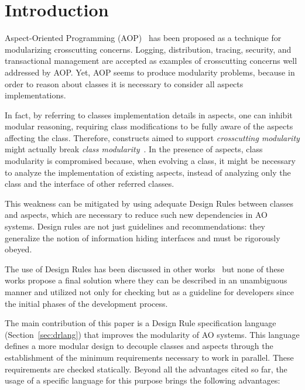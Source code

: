 \section{Introduction}


Aspect-Oriented Programming (AOP)~\cite{kiczales-ecoop-1997} has
been proposed as a technique for modularizing crosscutting concerns.
Logging, distribution, tracing, security, and transactional
management are accepted as examples of crosscutting concerns well
addressed by AOP. Yet, AOP seems to produce modularity problems,
because in order to reason about classes it is necessary to consider
all aspects implementations.

In fact, by referring to classes implementation details in aspects,
one can inhibit modular reasoning, requiring class modifications to
be fully aware of the aspects affecting the class. Therefore,
constructs aimed to support \emph{crosscutting modularity} might
actually break \emph{class modularity}~\cite{ribeiro-sbes-07}. In
the presence of aspects, class modularity is compromised because,
when evolving a class, it might be necessary to analyze the
implementation of existing aspects, instead of analyzing only the
class and the interface of other referred classes.

This weakness can be mitigated by using adequate Design Rules
between classes and aspects, which are necessary to reduce such new
dependencies in AO systems. Design rules are not just guidelines and
recommendations: they generalize the notion of information hiding
interfaces and must be rigorously obeyed.

The use of Design Rules has been discussed in other works~\cite{}
but none of these works propose a final solution where they can be
described in an unambiguous manner and utilized not only for
checking but as a guideline for developers since the initial phases
of the development process.

The main contribution of this paper is a Design Rule specification
language (Section~\ref{sec:drlang}) that improves the modularity of
AO systems. This language defines a more modular design to decouple
classes and aspects through the establishment of the minimum
requirements necessary to work in parallel. These requirements are
checked statically. Beyond all the advantages cited so far, the
usage of a specific language for this purpose brings the following
advantages:

